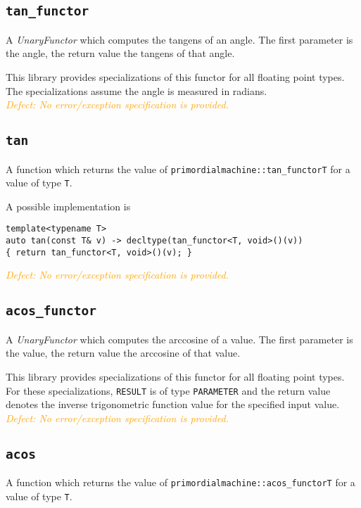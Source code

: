 \documentclass[oneside]{article}
\begin{document}
\subsection{\texttt{tan\_functor}}
A \textit{UnaryFunctor} which computes the
tangens
of an angle.
The first parameter is the angle, the return value the tangens of that angle.

\noindent{}This library provides specializations of this functor for all floating point types.
The specializations assume the angle is measured in radians.\\

\noindent{}\textcolor{orange}{\textit{Defect: No error/exception specification is provided.}}

\subsection{\texttt{tan}}
A function which returns the value of \texttt{primordialmachine::tan\_functor\textlangle T\textrangle}
for a value of type \texttt{T}.

\noindent{}A possible implementation is
\begin{verbatim}
template<typename T>
auto tan(const T& v) -> decltype(tan_functor<T, void>()(v))
{ return tan_functor<T, void>()(v); }
\end{verbatim}

\noindent{}\textcolor{orange}{\textit{Defect: No error/exception specification is provided.}}

\subsection{\texttt{acos\_functor}}
A \textit{UnaryFunctor} which computes the
arccosine
of a value.
The first parameter is the value, the return value the arccosine of that value.

\noindent{}This library provides specializations of this functor for all floating point types.
For these specializations, \texttt{RESULT} is of type \texttt{PARAMETER} and the return value
denotes the inverse trigonometric function value for the specified input value.\\

\noindent{}\textcolor{orange}{\textit{Defect: No error/exception specification is provided.}}

\subsection{\texttt{acos}}
A function which returns the value of \texttt{primordialmachine::acos\_functor\textlangle T\textrangle}
for a value of type \texttt{T}.
\end{document}
